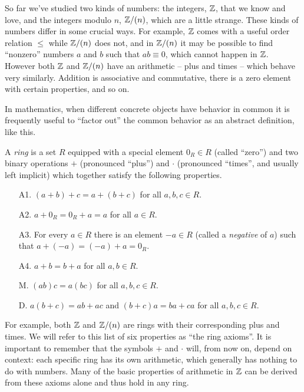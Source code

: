 So far we've studied two kinds of numbers: the integers, \(\mathbb{Z}\), that we know and love, and the integers modulo \(n\), \(\mathbb{Z}/(n)\), which are a little strange. These kinds of numbers differ in some crucial ways. For example, \(\mathbb{Z}\) comes with a useful order relation \(\leq\) while \(\mathbb{Z}/(n)\) does not, and in \(\mathbb{Z}/(n)\) it may be possible to find ``nonzero'' numbers \(a\) and \(b\) such that \(ab \equiv 0\), which cannot happen in \(\mathbb{Z}\). However both \(\mathbb{Z}\) and \(\mathbb{Z}/(n)\) have an arithmetic -- plus and times -- which behave very similarly. Addition is associative and commutative, there is a zero element with certain properties, and so on.

In mathematics, when different concrete objects have behavior in common it is frequently useful to ``factor out'' the common behavior as an abstract definition, like this.

\begin{dfn}[Ring] \label{dfn:ring}
A \emph{ring} is a set \(R\) equipped with a special element \(0_R \in R\) (called ``zero'') and two binary operations \(+\) (pronounced ``plus'') and \(\cdot\) (pronounced ``times'', and usually left implicit) which together satisfy the following properties.
\begin{itemize}
\item[A1.] \((a+b)+c = a+(b+c)\) for all \(a,b,c \in R\).
\item[A2.] \(a+0_R = 0_R+a = a\) for all \(a \in R\).
\item[A3.] For every \(a \in R\) there is an element \(-a \in R\) (called a \emph{negative} of \(a\)) such that \(a+(-a) = (-a)+a = 0_R\).
\item[A4.] \(a + b = b + a\) for all \(a,b \in R\).
\item[M.] \((ab)c = a(bc)\) for all \(a,b,c \in R\).
\item[D.] \(a(b+c) = ab + ac\) and \((b+c)a = ba + ca\) for all \(a,b,c \in R\).
\end{itemize}
\end{dfn}

For example, both \(\mathbb{Z}\) and \(\mathbb{Z}/(n)\) are rings with their corresponding plus and times. We will refer to this list of six properties as ``the ring axioms''. It is important to remember that the symbols \(+\) and \(\cdot\) will, from now on, depend on context: each specific ring has its own arithmetic, which generally has nothing to do with numbers. Many of the basic properties of arithmetic in \(\mathbb{Z}\) can be derived from these axioms alone and thus hold in any ring.

